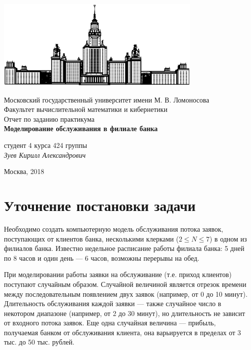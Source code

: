 \documentclass[oneside,final,12pt]{article}
\begin{document}
\begin{titlepage}
\begin{center}

    \bigskip
    \includegraphics[width=100mm]{msu.eps}

    \bigskip
    Московский государственный университет имени М. В. Ломоносова\\
    Факультет вычислительной математики и кибернетики\\[10mm]
   Отчет по заданию практикума \\[5mm]   
    \textsf{\large\bfseries
        Моделирование обслуживания в филиале банка
    }\\[50mm]

   
    \begin{flushright}
        \parbox{0.4\textwidth}{
            студент 4 курса 424 группы\\
            \emph{Зуев Кирилл Александрович}\\[5mm]
        }
    \end{flushright}

    \vspace{\fill}
    Москва, 2018
\end{center}
\end{titlepage}

\newpage
\renewcommand{\contentsname}{Содержание}
\tableofcontents

\newpage
\section{Уточнение постановки задачи}

Необходимо создать компьютерную модель обслуживания потока заявок, поступающих от клиентов банка, несколькими клерками ($2 \leq N \leq 7$) в одном из филиалов банка. Известно недельное расписание работы филиала банка: 5 дней по 8 часов и один день --- 6 часов, возможны перерывы на обед.

При моделировании работы заявки на обслуживание (т.е. приход клиентов) поступают случайным образом. Случайной величиной является отрезок времени между последовательным появлением двух заявок (например, от 0 до 10 минут). Длительность обслуживания каждой заявки --- также случайное число в некотором диапазоне (например, от 2 до 30 минут), но длительность не зависит от входного потока заявок. Еще одна случайная величина --- прибыль, получаемая банком от обслуживания клиента, она варьируется в пределах от 3 тыс. до 50 тыс. рублей.
\end{document}
